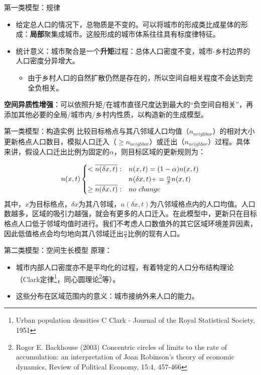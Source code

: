 \documentclass[utf8]{ctexbeamer}
\begin{document}
\begin{frame}{第一类模型：规律}
    \begin{itemize}
        \item 给定总人口的情况下，总物质是不变的。可以将城市的形成类比成星体的形成：\textbf{局部}聚集成城市。这般形成的城市体系往往具有标度律特征。
        \item 统计意义：城市聚合是一个\textbf{升矩}过程：总体人口密度不变，城市-乡村边界的人口密度分异增大。
        \begin{itemize}
            \item 由于乡村人口的自然扩散仍然是存在的，所以空间自相关程度不会达到完全负相关。
        \end{itemize}
    \end{itemize}
    \vspace{1cm}
    \textbf{空间异质性增强}：可以依照升矩/在城市直径尺度达到最大的“负空间自相关”，再添加其他必要的全局/城市内/乡村内性质，以构造新的生成模型。
\end{frame}

\begin{frame}{第一类模型：构造实例}
    比较目标格点与其八邻域人口均值（$n_{neighbor}$）的相对大小更新格点人口数目，模拟人口迁入（$\geq n_{neighbor}$）或迁出（$n_{neighbor}$）过程。具体来讲，假设人口迁出比例为固定的$\alpha$，则目标区域的更新规则为：

\begin{equation}
n(x,t) 
\begin{cases}
	<\overline{n(\delta x,t)}: & n(x,t)=(1-\alpha)n(x,t) \notag\\
	 & n(\delta x,t) += \frac{\alpha}{8}n(x,t)\notag\\
	\geq\overline{n(\delta x,t)}: & no\ change
\end{cases}
\end{equation}
其中，$x$为目标格点，$\delta x$为其八邻域，$\overline{n(\delta x,t)}$为八邻域格点内的人口均值。人口数越多，区域的吸引力越强，就会有更多的人口迁入。在此模型中，更新只在目标格点人口低于邻域均值时进行。我们不考虑人口数值外的其它区域环境差异因素，因此低值格点会均匀地向其八邻域迁出$\frac{\alpha}{8}$比例的现有人口。
\end{frame}

\begin{frame}{第二类模型：空间生长模型}
    原理：
    \begin{itemize}
        \item 城市内部人口密度亦不是平均化的过程，有着特定的人口分布结构理论（Clark定律\footnote{Urban population densities
    C Clark - Journal of the Royal Statistical Society, 1951}，同心圆理论\footnote{Roger E. Backhouse (2003) Concentric circles of limits to the rate of accumulation: an interpretation of Joan Robinson's theory of economic dynamics, Review of Political Economy, 15:4, 457-466}等）。
        \item 这些分布在区域范围内的意义：城市接纳外来人口的能力。
    \end{itemize}
\end{frame}
\end{document}
